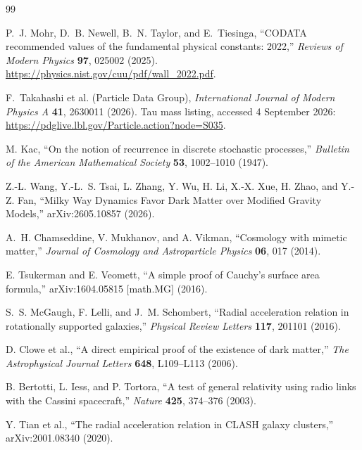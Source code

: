\documentclass[11pt]{article}
\begin{document}
\begin{thebibliography}{99}

P.~J. Mohr, D.~B. Newell, B.~N. Taylor, and E.~Tiesinga,
``CODATA recommended values of the fundamental physical constants: 2022,''
\emph{Reviews of Modern Physics} \textbf{97}, 025002 (2025).
\url{https://physics.nist.gov/cuu/pdf/wall_2022.pdf}.

F.~Takahashi et al. (Particle Data Group),
\emph{International Journal of Modern Physics A} \textbf{41}, 2630011 (2026).
Tau mass listing, accessed 4 September 2026:
\url{https://pdglive.lbl.gov/Particle.action?node=S035}.

M. Kac,
``On the notion of recurrence in discrete stochastic processes,''
\emph{Bulletin of the American Mathematical Society} \textbf{53},
1002--1010 (1947).

Z.-L. Wang, Y.-L.~S. Tsai, L. Zhang, Y. Wu, H. Li, X.-X. Xue, H. Zhao, and Y.-Z. Fan,
``Milky Way Dynamics Favor Dark Matter over Modified Gravity Models,''
arXiv:2605.10857 (2026).

A.~H. Chamseddine, V. Mukhanov, and A. Vikman,
``Cosmology with mimetic matter,''
\emph{Journal of Cosmology and Astroparticle Physics} \textbf{06}, 017 (2014).

E. Tsukerman and E. Veomett,
``A simple proof of Cauchy's surface area formula,''
arXiv:1604.05815 [math.MG] (2016).

S.~S. McGaugh, F. Lelli, and J.~M. Schombert,
``Radial acceleration relation in rotationally supported galaxies,''
\emph{Physical Review Letters} \textbf{117}, 201101 (2016).

D. Clowe et al.,
``A direct empirical proof of the existence of dark matter,''
\emph{The Astrophysical Journal Letters} \textbf{648}, L109--L113 (2006).

B. Bertotti, L. Iess, and P. Tortora,
``A test of general relativity using radio links with the Cassini spacecraft,''
\emph{Nature} \textbf{425}, 374--376 (2003).

Y. Tian et al.,
``The radial acceleration relation in CLASH galaxy clusters,''
arXiv:2001.08340 (2020).


\end{thebibliography}
\end{document}
